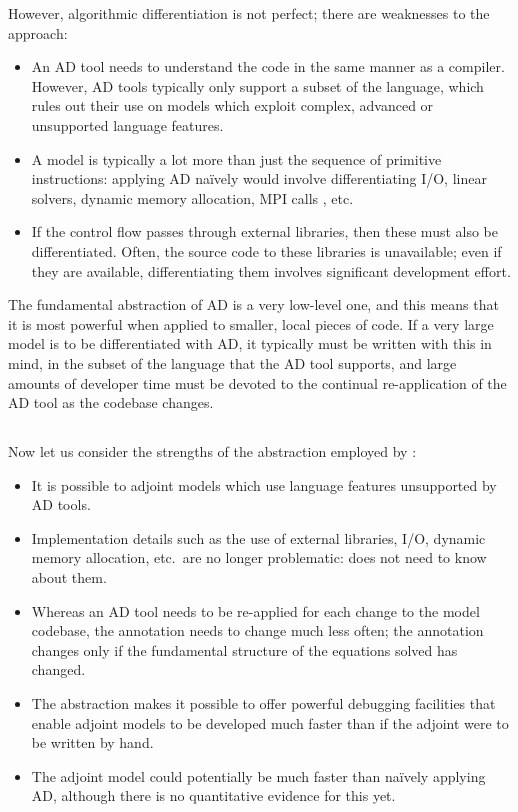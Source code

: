 However, algorithmic differentiation is not perfect; there are weaknesses to
the approach:
\begin{itemize}
\item An AD tool needs to understand the code in the same manner as a compiler.
However, AD tools typically only support a subset of the language, which rules
out their use on models which exploit complex, advanced or unsupported language features.
\item A model is typically a lot more than just the sequence of primitive instructions:
applying AD na\"ively would involve differentiating I/O, linear solvers, dynamic
memory allocation, MPI calls \citep{utke2009}, etc.
\item If the control flow passes through external libraries, then these must also be
differentiated. Often, the source code to these libraries is unavailable; even if they
are available, differentiating them involves significant development effort.
\end{itemize}

The fundamental abstraction of AD is a very low-level one, and this means that it is
most powerful when applied to smaller, local pieces of code. If a very large
model is to be differentiated with AD, it typically must be written with this in
mind, in the subset of the language that the AD tool supports, and large amounts
of developer time must be devoted to the continual re-application of the AD tool
as the codebase changes.

\subsection{\libadjoint}

Now let us consider the strengths of the abstraction employed by \libadjoint:
\begin{itemize}
\item It is possible to adjoint models which use language features unsupported 
by AD tools.
\item Implementation details such as the use of external libraries, I/O, dynamic
memory allocation, etc.\ are no longer problematic: \libadjoint does not need to
know about them.
\item Whereas an AD tool needs to be re-applied for each change to the model
codebase, the \libadjoint annotation needs to change much less often; the annotation changes
only if the fundamental structure of the equations solved has changed.
\item The abstraction makes it possible to offer powerful debugging facilities that enable adjoint models
to be developed much faster than if the adjoint were to be written by hand. %
\item The adjoint model could potentially be much faster than na\"ively applying AD, although
there is no quantitative evidence for this yet.
\end{itemize}

